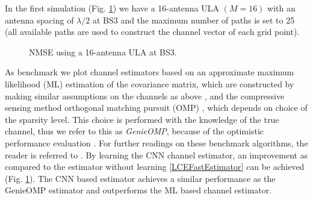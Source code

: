 \documentclass[12pt, draftclsnofoot, onecolumn]{IEEEtran}
\begin{document}
In the first simulation (Fig. \ref{fig:LOS}) we have a 16-antenna ULA $(M=16)$ with an antenna spacing of $\lambda/2$ at BS3 and the maximum number of paths is set to 25 (all available paths are used to construct the channel vector of each grid point). 
\begin{figure}[t]
    \centering
\caption{NMSE using a 16-antenna ULA at BS3.}
\label{fig:LOS}
\end{figure}
As benchmark we plot channel estimators based on an approximate maximum likelihood (ML) estimation of the covariance matrix, which are constructed by making similar assumptions on the channels as above \cite{Neumann, Hellings, Neumann2}, and the compressive sensing method orthogonal matching pursuit (OMP) \cite{OMP}, which depends on choice of the sparsity level. This choice is performed with the knowledge of the true channel, thus we refer to this as \textit{GenieOMP}, because of the optimistic performance evaluation \cite{Neumann, Hellings}. For further readings on these benchmark algorithms, the reader is referred to \cite{Neumann}. By learning the CNN channel estimator, an improvement as compared to the estimator without learning  \eqref{LCEFastEstimator} can be achieved (Fig. \ref{fig:LOS}). The CNN based estimator achieves a similar performance as the GenieOMP estimator and outperforms the ML based channel estimator. 
\end{document}
